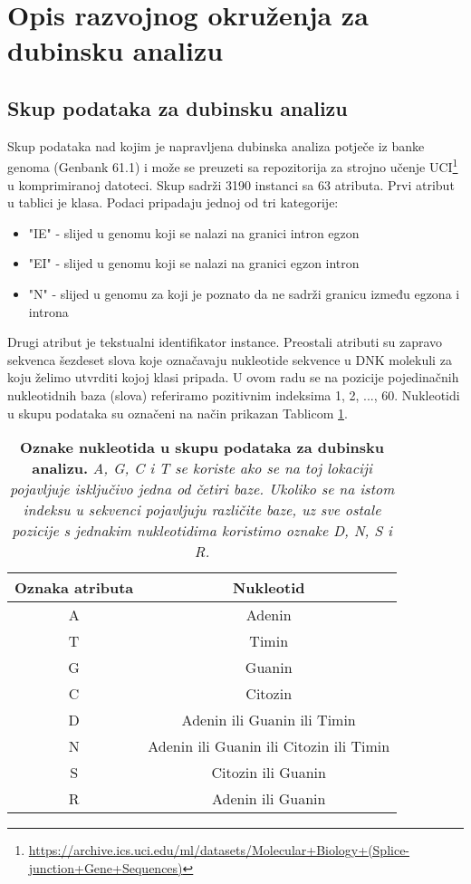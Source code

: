 \section{Opis razvojnog okruženja za dubinsku analizu}
\label{ch:ch2}

\subsection{Skup podataka za dubinsku analizu}

Skup podataka nad kojim je napravljena dubinska analiza potječe iz banke genoma
(Genbank 61.1) i može se preuzeti sa repozitorija za strojno učenje UCI\footnote
{\url{https://archive.ics.uci.edu/ml/datasets/Molecular+Biology+(Splice-junction+Gene+Sequences)}}
u komprimiranoj datoteci. Skup sadrži 3190 instanci sa 63 atributa.
Prvi atribut u tablici je klasa. Podaci pripadaju jednoj od tri kategorije:
\begin{itemize}
   \item "IE" - slijed u genomu koji se nalazi na granici intron egzon
   \item "EI" - slijed u genomu koji se nalazi na granici egzon intron
   \item "N" - slijed u genomu za koji je poznato da ne sadrži granicu između egzona i introna
\end{itemize}
Drugi atribut je tekstualni identifikator instance.
Preostali atributi su zapravo sekvenca šezdeset slova koje označavaju nukleotide
sekvence u DNK molekuli za koju želimo utvrditi kojoj klasi pripada. U ovom radu se na pozicije pojedinačnih nukleotidnih baza (slova) referiramo pozitivnim indeksima {1, 2, ..., 60}.
Nukleotidi u skupu podataka su označeni na način prikazan Tablicom \ref{tab:oznake}.

\begin{table}[!ht]
   \caption[Oznake nukleotida u skupu podataka za dubinsku analizu]{
   \textbf{Oznake nukleotida u skupu podataka za dubinsku analizu.} \textit{A, G, C i T se koriste ako se na
   toj lokaciji pojavljuje isključivo jedna od četiri baze. Ukoliko se na istom indeksu u sekvenci
   pojavljuju različite baze, uz sve ostale pozicije s jednakim nukleotidima koristimo oznake D, N, S i R.}}
   \centering
   \begin{tabular}{||c | c ||}
   \hline
   Oznaka atributa & Nukleotid \\ [0.5ex]
   \hline\hline
   A & Adenin \\
   T & Timin \\ 
   G & Guanin \\ 
   C & Citozin \\
   D & Adenin ili Guanin ili Timin \\
   N & Adenin ili Guanin ili Citozin ili Timin \\
   S & Citozin ili Guanin \\
   R & Adenin ili Guanin \\ [1ex]
   \hline
   \end{tabular}
   \label{tab:oznake}
\end{table}

